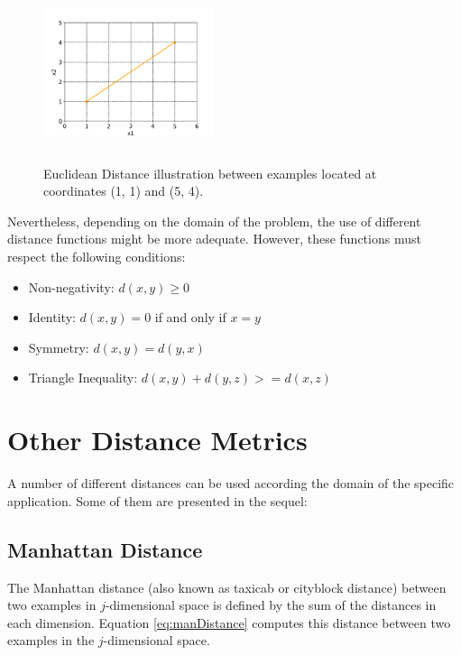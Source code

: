 \begin{figure}[h]
    \centering
    \includegraphics[height = 4.5cm, width =  5cm]{"Part 3 - Learning Systems/Supervised Learning/k-Nearest Neighbors/figures/EuclideanDistance2.png"}
    \label{fig:EucDistance}
    \caption{Euclidean Distance illustration between examples located at coordinates (1, 1) and (5, 4).}
\end{figure}

Nevertheless, depending on the domain of the problem, the use of different distance functions might be more adequate. However, these functions must respect the following conditions:

\begin{itemize}
    \item Non-negativity: $d(x, y) \geq 0$
    \item Identity: $d(x, y) = 0$ if and only if $x = y$
    \item Symmetry: $d(x, y) = d(y, x)$    
    \item Triangle Inequality: $d(x, y) + d(y, z) >= d(x, z)$
\end{itemize} %

\section{Other Distance Metrics}

A number of different distances can be used according the domain of the specific application. Some of them are presented in the sequel:  

\subsection{Manhattan Distance}


The Manhattan distance \cite{Craw2010} (also known as taxicab or cityblock distance) between two examples in $j$-dimensional space is defined by the sum of the distances in each dimension. Equation \ref{eq:manDistance} computes this distance between two examples in the $j$-dimensional space.

